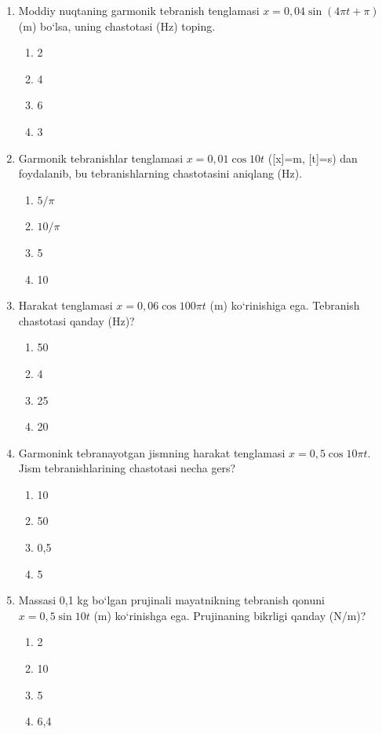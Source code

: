 \begin{enumerate}

\item Moddiy nuqtaning garmonik tebranish tenglamasi $x = 0,04 \sin(4\pi t + \pi)$ (m) bo‘lsa, uning chastotasi (Hz) toping.
\begin{enumerate}[label=\Alph*)]
\item 2
\item 4
\item 6
\item 3
\end{enumerate}

\item Garmonik tebranishlar tenglamasi $x = 0,01 \cos 10t$ ([x]=m, [t]=s) dan foydalanib, bu tebranishlarning chastotasini aniqlang (Hz).
\begin{enumerate}[label=\Alph*)]
\item $5/\pi$
\item $10/\pi$
\item 5
\item 10
\end{enumerate}

\item Harakat tenglamasi $x = 0,06 \cos 100\pi t$ (m) ko‘rinishiga ega. Tebranish chastotasi qanday (Hz)?
\begin{enumerate}[label=\Alph*)]
\item 50
\item 4
\item 25
\item 20
\end{enumerate}

\item Garmonink tebranayotgan jismning harakat tenglamasi $x = 0,5 \cos 10\pi t$. Jism tebranishlarining chastotasi necha gers?
\begin{enumerate}[label=\Alph*)]
\item 10
\item 50
\item 0,5
\item 5
\end{enumerate}

\item Massasi 0,1 kg bo‘lgan prujinali mayatnikning tebranish qonuni $x = 0,5 \sin 10t$ (m) ko‘rinishga ega. Prujinaning bikrligi qanday (N/m)?
\begin{enumerate}[label=\Alph*)]
\item 2
\item 10
\item 5
\item 6,4
\end{enumerate}


\end{enumerate}
